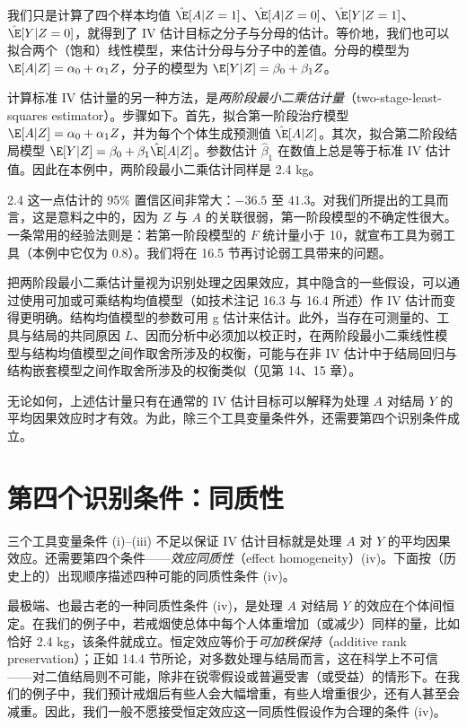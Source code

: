 我们只是计算了四个样本均值 $\hat{\E}[A|Z=1]$、$\hat{\E}[A|Z=0]$、$\hat{\E}[Y|Z=1]$、$\hat{\E}[Y|Z=0]$，就得到了 IV 估计目标之分子与分母的估计。等价地，我们也可以拟合两个（饱和）线性模型，来估计分母与分子中的差值。分母的模型为 $\E[A|Z]=\alpha_0+\alpha_1 Z$，分子的模型为 $\E[Y|Z]=\beta_0+\beta_1 Z$。

计算标准 IV 估计量的另一种方法，是\emph{两阶段最小二乘估计量}（two-stage-least-squares estimator）。步骤如下。首先，拟合第一阶段治疗模型 $\E[A|Z]=\alpha_0+\alpha_1 Z$，并为每个个体生成预测值 $\hat{\E}[A|Z]$。其次，拟合第二阶段结局模型 $\E[Y|Z]=\beta_0+\beta_1\hat{\E}[A|Z]$。参数估计 $\hat\beta_1$ 在数值上总是等于标准 IV 估计值。因此在本例中，两阶段最小二乘估计同样是 2.4 kg。

2.4 这一点估计的 95\% 置信区间非常大：$-36.5$ 至 $41.3$。对我们所提出的工具而言，这是意料之中的，因为 $Z$ 与 $A$ 的关联很弱，第一阶段模型的不确定性很大。一条常用的经验法则是：若第一阶段模型的 $F$ 统计量小于 10，就宣布工具为弱工具（本例中它仅为 0.8）。我们将在 16.5 节再讨论弱工具带来的问题。

把两阶段最小二乘估计量视为识别处理之因果效应，其中隐含的一些假设，可以通过使用可加或可乘结构均值模型（如技术注记 16.3 与 16.4 所述）作 IV 估计而变得更明确。结构均值模型的参数可用 g 估计来估计。此外，当存在可测量的、工具与结局的共同原因 $L$、因而分析中必须加以校正时，在两阶段最小二乘线性模型与结构均值模型之间作取舍所涉及的权衡，可能与在非 IV 估计中于结局回归与结构嵌套模型之间作取舍所涉及的权衡类似（见第 14、15 章）。

无论如何，上述估计量只有在通常的 IV 估计目标可以解释为处理 $A$ 对结局 $Y$ 的平均因果效应时才有效。为此，除三个工具变量条件外，还需要第四个识别条件成立。

\section{第四个识别条件：同质性}

三个工具变量条件 (i)–(iii) 不足以保证 IV 估计目标就是处理 $A$ 对 $Y$ 的平均因果效应。还需要第四个条件——\emph{效应同质性}（effect homogeneity）(iv)。下面按（历史上的）出现顺序描述四种可能的同质性条件 (iv)。

最极端、也最古老的一种同质性条件 (iv)，是处理 $A$ 对结局 $Y$ 的效应在个体间恒定。在我们的例子中，若戒烟使总体中每个人体重增加（或减少）同样的量，比如恰好 2.4 kg，该条件就成立。恒定效应等价于\emph{可加秩保持}（additive rank preservation）；正如 14.4 节所论，对多数处理与结局而言，这在科学上不可信——对二值结局则不可能，除非在锐零假设或普遍受害（或受益）的情形下。在我们的例子中，我们预计戒烟后有些人会大幅增重，有些人增重很少，还有人甚至会减重。因此，我们一般不愿接受恒定效应这一同质性假设作为合理的条件 (iv)。

